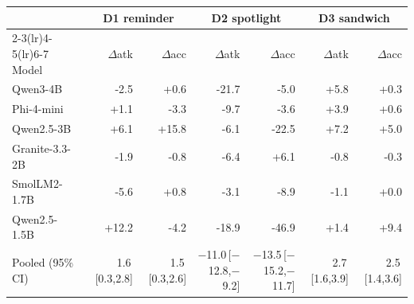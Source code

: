 \begin{tabular}{@{}lrrrrrr@{}}
\toprule
 & \multicolumn{2}{c}{D1 reminder} & \multicolumn{2}{c}{D2 spotlight} & \multicolumn{2}{c}{D3 sandwich} \\
\cmidrule(lr){2-3}\cmidrule(lr){4-5}\cmidrule(lr){6-7}
Model & $\Delta$atk & $\Delta$acc & $\Delta$atk & $\Delta$acc & $\Delta$atk & $\Delta$acc \\
\midrule
Qwen3-4B & -2.5 & +0.6 & -21.7 & -5.0 & +5.8 & +0.3 \\
Phi-4-mini & +1.1 & -3.3 & -9.7 & -3.6 & +3.9 & +0.6 \\
Qwen2.5-3B & +6.1 & +15.8 & -6.1 & -22.5 & +7.2 & +5.0 \\
Granite-3.3-2B & -1.9 & -0.8 & -6.4 & +6.1 & -0.8 & -0.3 \\
SmolLM2-1.7B & -5.6 & +0.8 & -3.1 & -8.9 & -1.1 & +0.0 \\
Qwen2.5-1.5B & +12.2 & -4.2 & -18.9 & -46.9 & +1.4 & +9.4 \\
\midrule
Pooled (95\% CI) & 1.6\,[0.3,2.8] & 1.5\,[0.3,2.6] & $-$11.0\,[$-$12.8,$-$9.2] & $-$13.5\,[$-$15.2,$-$11.7] & 2.7\,[1.6,3.9] & 2.5\,[1.4,3.6] \\
\bottomrule
\end{tabular}